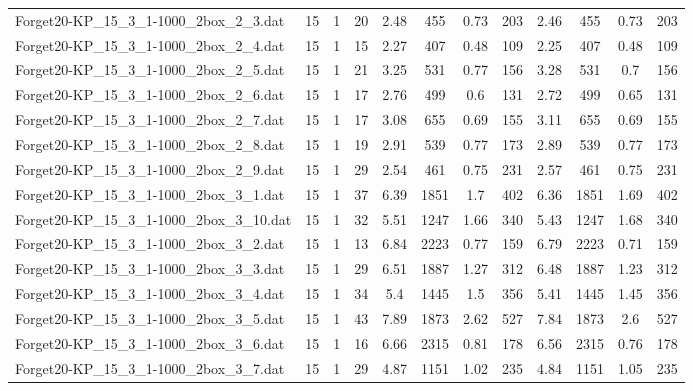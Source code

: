 \begin{sidewaystable}[!ht]
{\begin{tabular}{lccccccccccc}
Forget20-KP\_15\_3\_1-1000\_2box\_2\_3.dat & 15 & 1 & 20 & 2.48 & 455 &  \textcolor{blue2}{0.73} & 203 & 2.46 & 455 &  \textcolor{blue2}{0.73} & 203 \\
Forget20-KP\_15\_3\_1-1000\_2box\_2\_4.dat & 15 & 1 & 15 & 2.27 & 407 &  \textcolor{blue2}{0.48} & 109 & 2.25 & 407 &  \textcolor{blue2}{0.48} & 109 \\
Forget20-KP\_15\_3\_1-1000\_2box\_2\_5.dat & 15 & 1 & 21 & 3.25 & 531 & 0.77 & 156 & 3.28 & 531 &  \textcolor{blue2}{0.7} & 156 \\
Forget20-KP\_15\_3\_1-1000\_2box\_2\_6.dat & 15 & 1 & 17 & 2.76 & 499 &  \textcolor{blue2}{0.6} & 131 & 2.72 & 499 & 0.65 & 131 \\
Forget20-KP\_15\_3\_1-1000\_2box\_2\_7.dat & 15 & 1 & 17 & 3.08 & 655 &  \textcolor{blue2}{0.69} & 155 & 3.11 & 655 &  \textcolor{blue2}{0.69} & 155 \\
Forget20-KP\_15\_3\_1-1000\_2box\_2\_8.dat & 15 & 1 & 19 & 2.91 & 539 &  \textcolor{blue2}{0.77} & 173 & 2.89 & 539 &  \textcolor{blue2}{0.77} & 173 \\
Forget20-KP\_15\_3\_1-1000\_2box\_2\_9.dat & 15 & 1 & 29 & 2.54 & 461 &  \textcolor{blue2}{0.75} & 231 & 2.57 & 461 &  \textcolor{blue2}{0.75} & 231 \\
Forget20-KP\_15\_3\_1-1000\_2box\_3\_1.dat & 15 & 1 & 37 & 6.39 & 1851 & 1.7 & 402 & 6.36 & 1851 & 1.69 & 402 \\
Forget20-KP\_15\_3\_1-1000\_2box\_3\_10.dat & 15 & 1 & 32 & 5.51 & 1247 &  \textcolor{blue2}{1.66} & 340 & 5.43 & 1247 & 1.68 & 340 \\
Forget20-KP\_15\_3\_1-1000\_2box\_3\_2.dat & 15 & 1 & 13 & 6.84 & 2223 & 0.77 & 159 & 6.79 & 2223 &  \textcolor{blue2}{0.71} & 159 \\
Forget20-KP\_15\_3\_1-1000\_2box\_3\_3.dat & 15 & 1 & 29 & 6.51 & 1887 & 1.27 & 312 & 6.48 & 1887 &  \textcolor{blue2}{1.23} & 312 \\
Forget20-KP\_15\_3\_1-1000\_2box\_3\_4.dat & 15 & 1 & 34 & 5.4 & 1445 & 1.5 & 356 & 5.41 & 1445 &  \textcolor{blue2}{1.45} & 356 \\
Forget20-KP\_15\_3\_1-1000\_2box\_3\_5.dat & 15 & 1 & 43 & 7.89 & 1873 & 2.62 & 527 & 7.84 & 1873 &  \textcolor{blue2}{2.6} & 527 \\
Forget20-KP\_15\_3\_1-1000\_2box\_3\_6.dat & 15 & 1 & 16 & 6.66 & 2315 & 0.81 & 178 & 6.56 & 2315 & 0.76 & 178 \\
Forget20-KP\_15\_3\_1-1000\_2box\_3\_7.dat & 15 & 1 & 29 & 4.87 & 1151 &  \textcolor{blue2}{1.02} & 235 & 4.84 & 1151 & 1.05 & 235 \\

\end{tabular}}
\end{sidewaystable}
